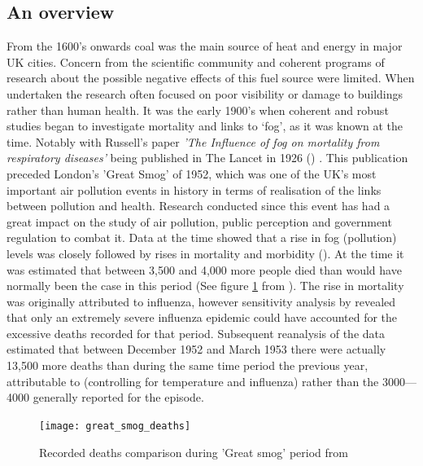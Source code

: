 \subsection{An overview}
\label{subsec:anoverview}



From the 1600’s onwards coal was the main source of heat and energy in major UK cities. Concern from the scientific community and coherent programs of research about the possible negative effects of this fuel source were limited. When undertaken the research often focused on poor visibility or damage to buildings rather than human health. It was the early 1900’s when coherent and robust studies began to investigate mortality and links to ‘fog’, as it was known at the time. Notably with Russell’s paper \textit{'The Influence of fog on mortality from respiratory diseases'} being published in The Lancet in 1926 (\cite{Russell1926}) . This publication preceded London's 'Great Smog' of 1952, which was one of the UK's most important air pollution events in history in terms of realisation of the links between pollution and health. Research conducted since this event has had a great impact on the study of air pollution, public perception and government regulation to combat it. Data at the time showed that a rise in fog (pollution) levels was closely followed by rises in mortality and morbidity (\cite{Bell2003}). At the time it was estimated that between 3,500 and 4,000 more people died than would have normally been the case in this period (See figure \ref{fig:greatsmogdeaths} from \cite{GreaterLondonAuthorityGLA2002}). The rise in mortality was originally attributed to influenza, however sensitivity analysis by \cite{Bell2003} revealed that only an extremely severe influenza epidemic could have accounted for the excessive deaths recorded for that period. Subsequent reanalysis of the data estimated that between December 1952 and March 1953 there were actually 13,500 more deaths than during the same time period the previous year, attributable to (controlling for temperature and influenza) rather than the 3000--–4000 generally reported for the episode.

\begin{figure}[H]
\centering
\texttt{[image: great\_smog\_deaths]}
\caption{Recorded deaths comparison during 'Great smog' period from \cite{GreaterLondonAuthorityGLA2002}}
\label{fig:greatsmogdeaths}
\end{figure}

